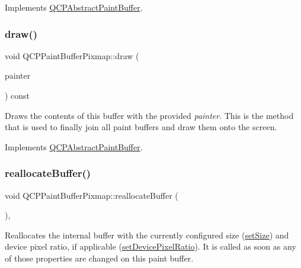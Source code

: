 Implements \hyperlink{class_q_c_p_abstract_paint_buffer_a9e253f4541dfc01992b77e8830bd7722}{Q\+C\+P\+Abstract\+Paint\+Buffer}.

\mbox{\label{class_q_c_p_paint_buffer_pixmap_af7bfc685e56a0a9329e57cd9a265eb74}} 
\subsubsection{\texorpdfstring{draw()}{draw()}}
{\footnotesize\ttfamily void Q\+C\+P\+Paint\+Buffer\+Pixmap\+::draw (\begin{DoxyParamCaption}\item[{\hyperlink{class_q_c_p_painter}{Q\+C\+P\+Painter} $\ast$}]{painter }\end{DoxyParamCaption}) const\hspace{0.3cm}{\ttfamily [virtual]}}

Draws the contents of this buffer with the provided {\itshape painter}. This is the method that is used to finally join all paint buffers and draw them onto the screen. 

Implements \hyperlink{class_q_c_p_abstract_paint_buffer_afb998c7525e3ae37d9d2d46c7aaf461a}{Q\+C\+P\+Abstract\+Paint\+Buffer}.

\mbox{\label{class_q_c_p_paint_buffer_pixmap_ad49f3205ba3463b1c44f8db3cfcc90f0}} 
\subsubsection{\texorpdfstring{reallocate\+Buffer()}{reallocateBuffer()}}
{\footnotesize\ttfamily void Q\+C\+P\+Paint\+Buffer\+Pixmap\+::reallocate\+Buffer (\begin{DoxyParamCaption}{ }\end{DoxyParamCaption})\hspace{0.3cm}{\ttfamily [protected]}, {\ttfamily [virtual]}}

Reallocates the internal buffer with the currently configured size (\hyperlink{class_q_c_p_abstract_paint_buffer_a8b68c3cd36533f1a4a23b5ce8cd66f01}{set\+Size}) and device pixel ratio, if applicable (\hyperlink{class_q_c_p_abstract_paint_buffer_a555eaad5d5c806420ff35602a1bb68fa}{set\+Device\+Pixel\+Ratio}). It is called as soon as any of those properties are changed on this paint buffer.

